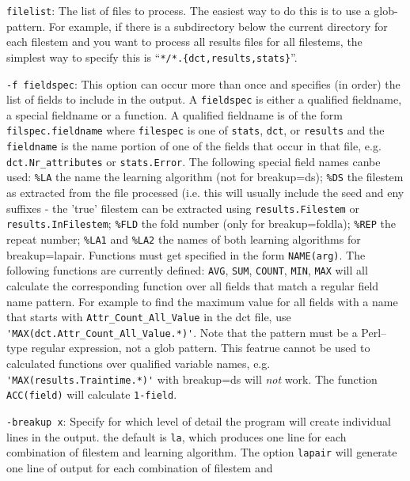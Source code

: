 \documentclass[a4paper,10pt,twoside]{article}
\newenvironment{optionlist}
{\begin{list}{}
    {\setlength{\itemsep}{0em plus0em minus0ex}
      \setlength{\parsep}{0ex}
      \setlength{\topsep}{0em}
      \setlength{\leftmargin}{2em}
      \setlength{\listparindent}{0em}
      \setlength{\itemindent}{-2em}
      \setlength{\partopsep}{0ex}
    }}
  {\end{list}}
\begin{document}
\begin{optionlist}
\item \verb=filelist=: The list of files to process. The easiest way to
  do this is to use a glob-pattern. For example, if there is a 
  subdirectory below the current directory for each filestem and 
  you want to process all results files for all filestems, the simplest
  way to specify this is ``\verb=*/*.{dct,results,stats}=''.
\item \verb=-f fieldspec=: This option can occur more than once and specifies
  (in order) the list of fields to include in the output. A \verb=fieldspec=
  is either a qualified fieldname, a special fieldname or a function.
  A qualified fieldname is of the form \verb=filspec.fieldname= where 
  \verb=filespec= is one of \verb=stats=, \verb=dct=, or \verb=results= 
  and the \verb=fieldname= is the name portion of one of the fields that
  occur in that file, e.g. \verb=dct.Nr_attributes= or \verb=stats.Error=.
  The following special field names canbe used: \verb=%LA= the name 
  the learning algorithm (not for breakup=ds); \verb=%DS= the filestem as
  extracted from the file processed (i.e. this will usually include the
  seed and eny suffixes - the 'true' filestem 
  can be extracted using \verb=results.Filestem= or \verb=results.InFilestem=;
  \verb=%FLD= the fold number (only for breakup=foldla);  \verb=%REP= 
  the repeat number; \verb=%LA1= and \verb=%LA2= the names of both learning
  algorithms for breakup=lapair.
  Functions must get specified in the form \verb=NAME(arg)=. The following
  functions are currently defined: \verb=AVG=, \verb=SUM=, \verb=COUNT=,
  \verb=MIN=, \verb=MAX= will all calculate the corresponding function
  over all fields that match a regular field name pattern. For example to
  find the maximum value for all fields with a name that starts with 
  \verb=Attr_Count_All_Value= in the dct file, use \verb='MAX(dct.Attr_Count_All_Value.*)'=. Note that the pattern must be a Perl--type regular expression,
  not a glob pattern. This featrue cannot be used to calculated
  functions over qualified variable names, e.g. \verb='MAX(results.Traintime.*)'= with breakup=ds will \emph{not} work. The function \verb=ACC(field)= will
  calculate \verb=1-field=.
\item \verb=-breakup x=: Specify for which level of detail the program
  will create individual lines in the output. 
  the default is  \verb=la=, which produces one line for each combination
  of filestem and learning algorithm. The option \verb=lapair= will
  generate one line of output for each combination of filestem and

\end{optionlist}
\end{document}
